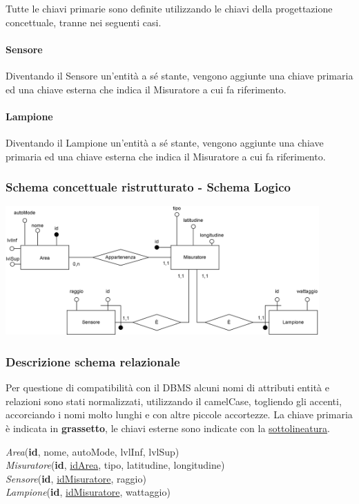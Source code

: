 Tutte le chiavi primarie sono definite utilizzando le chiavi della progettazione concettuale, tranne nei seguenti casi.

\paragraph{Sensore} Diventando il Sensore un'entità a sé stante, vengono aggiunte una chiave primaria ed una chiave esterna che indica il Misuratore a cui fa riferimento.

\paragraph{Lampione} Diventando il Lampione un'entità a sé stante, vengono aggiunte una chiave primaria ed una chiave esterna che indica il Misuratore a cui fa riferimento.

\subsubsection{Schema concettuale ristrutturato - Schema Logico}

\begin{center}
    \includegraphics[width=12cm]{contenuti/specifica-basi-dati/img-sbd/anagrafica_logico.png}
\end{center}

\subsubsection{Descrizione schema relazionale}

Per questione di compatibilità con il DBMS alcuni nomi di attributi entità e relazioni sono stati normalizzati, utilizzando il camelCase, togliendo gli accenti, accorciando i nomi molto lunghi e con altre piccole accortezze.
La chiave primaria è indicata in \textbf{grassetto}, le chiavi esterne sono indicate con la \underline{sottolineatura}.

\textit{Area}(\textbf{id}, nome, autoMode, lvlInf, lvlSup) \\
\textit{Misuratore}(\textbf{id}, \underline{idArea}, tipo, latitudine, longitudine) \\
\textit{Sensore}(\textbf{id}, \underline{idMisuratore}, raggio) \\
\textit{Lampione}(\textbf{id}, \underline{idMisuratore}, wattaggio)

